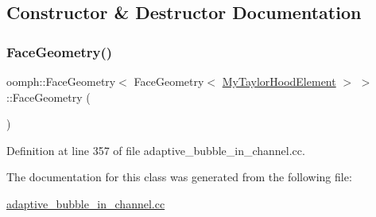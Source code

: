 \subsection{Constructor \& Destructor Documentation}
\mbox{\label{classoomph_1_1FaceGeometry_3_01FaceGeometry_3_01MyTaylorHoodElement_01_4_01_4_a35f1bde1f3b3cc7c29d417cd75f0ef86}} 
\subsubsection{\texorpdfstring{Face\+Geometry()}{FaceGeometry()}}
{\footnotesize\ttfamily oomph\+::\+Face\+Geometry$<$ Face\+Geometry$<$ \hyperlink{classoomph_1_1MyTaylorHoodElement}{My\+Taylor\+Hood\+Element} $>$ $>$\+::Face\+Geometry (\begin{DoxyParamCaption}{ }\end{DoxyParamCaption})\hspace{0.3cm}{\ttfamily [inline]}}



Definition at line 357 of file adaptive\+\_\+bubble\+\_\+in\+\_\+channel.\+cc.



The documentation for this class was generated from the following file\+:\begin{DoxyCompactItemize}
\item 
\hyperlink{adaptive__bubble__in__channel_8cc}{adaptive\+\_\+bubble\+\_\+in\+\_\+channel.\+cc}\end{DoxyCompactItemize}
